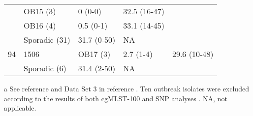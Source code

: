 \begin{table}[h!]
{\begin{threeparttable}[b]
\begin{tabular}{@{}lllll@{}}
        ~ & OB15 (3) & 0 (0-0) & 32.5 (16-47) & ~ \\
        ~ & OB16 (4) & 0.5 (0-1) & 33.1 (14-45) & ~ \\
        ~ & Sporadic (31) & 31.7 (0-50) & NA & ~ \\
        94 & 1506 & OB17 (3) & 2.7 (1-4) & 29.6 (10-48) \\
        ~ & Sporadic (6) & 31.4 (2-50) & NA & ~ \\
        \bottomrule
    \end{tabular}
    \begin{tablenotes}
       \item [a] {\footnotesize See reference \cite{coelho_genomic_2019} and Data Set 3 in reference \cite{friaes_supplemental_2023}. Ten outbreak isolates were excluded according to the results of both cgMLST-100 and SNP analyses \cite{coelho_genomic_2019}. NA, not applicable.}
    \end{tablenotes}
    \end{threeparttable}
    }
\end{table}